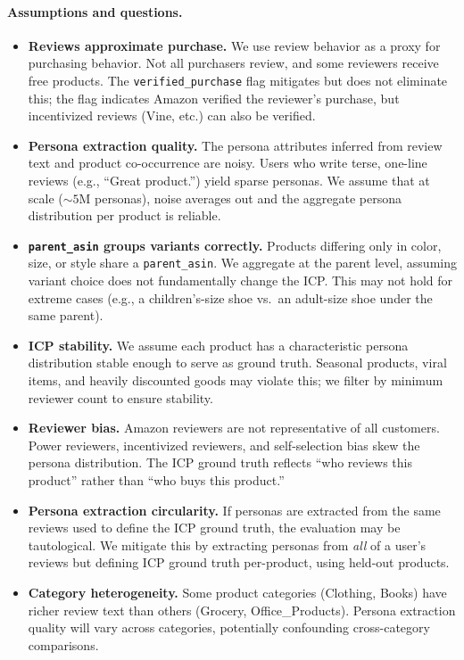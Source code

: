\paragraph{Assumptions and questions.}
\begin{itemize}
    \item \textbf{Reviews approximate purchase.} We use review behavior as a proxy for purchasing behavior. Not all purchasers review, and some reviewers receive free products. The \texttt{verified\_purchase} flag mitigates but does not eliminate this; the flag indicates Amazon verified the reviewer's purchase, but incentivized reviews (Vine, etc.) can also be verified.
    \item \textbf{Persona extraction quality.} The persona attributes inferred from review text and product co-occurrence are noisy. Users who write terse, one-line reviews (e.g., ``Great product.'') yield sparse personas. We assume that at scale (${\sim}5$M personas), noise averages out and the aggregate persona distribution per product is reliable.
    \item \textbf{\texttt{parent\_asin} groups variants correctly.} Products differing only in color, size, or style share a \texttt{parent\_asin}. We aggregate at the parent level, assuming variant choice does not fundamentally change the ICP. This may not hold for extreme cases (e.g., a children's-size shoe vs.\ an adult-size shoe under the same parent).
    \item \textbf{ICP stability.} We assume each product has a characteristic persona distribution stable enough to serve as ground truth. Seasonal products, viral items, and heavily discounted goods may violate this; we filter by minimum reviewer count to ensure stability.
    \item \textbf{Reviewer bias.} Amazon reviewers are not representative of all customers. Power reviewers, incentivized reviewers, and self-selection bias skew the persona distribution. The ICP ground truth reflects ``who reviews this product'' rather than ``who buys this product.''
    \item \textbf{Persona extraction circularity.} If personas are extracted from the same reviews used to define the ICP ground truth, the evaluation may be tautological. We mitigate this by extracting personas from \emph{all} of a user's reviews but defining ICP ground truth per-product, using held-out products.
    \item \textbf{Category heterogeneity.} Some product categories (Clothing, Books) have richer review text than others (Grocery, Office\_Products). Persona extraction quality will vary across categories, potentially confounding cross-category comparisons.

\end{itemize}
